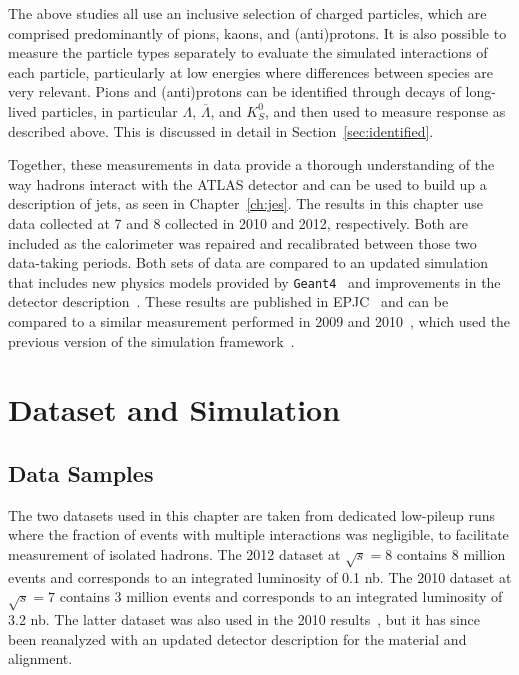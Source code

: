 The above studies all use an inclusive selection of charged particles, which are comprised predominantly of pions, kaons, and (anti)protons.
It is also possible to measure the particle types separately to evaluate the simulated interactions of each particle, particularly at low energies where differences between species are very relevant.
Pions and (anti)protons can be identified through decays of long-lived particles, in particular $\Lambda$, $\overline{\Lambda}$, and $K_{S}^{0}$, and then used to measure response as described above.
This is discussed in detail in Section~\ref{sec:identified}.

Together, these measurements in data provide a thorough understanding of the way hadrons interact with the ATLAS detector and can be used to build up a description of jets, as seen in Chapter~\ref{ch:jes}.
The results in this chapter use data collected at 7 and 8 \TeV collected in 2010 and 2012, respectively.
Both are included as the calorimeter was repaired and recalibrated between those two data-taking periods.
Both sets of data are compared to an updated simulation that includes new physics models provided by \texttt{Geant4}~\cite{GEANT4} and improvements in the detector description~\cite{PERF-2011-08,PERF-2013-05}.
These results are published in \ac{EPJC}~\cite{PERF-2015-05} and can be compared to a similar measurement performed in 2009 and 2010~\cite{PERF-2011-05}, which used the previous version of the simulation framework~\cite{SOFT-2010-01}.

\section{Dataset and Simulation}

\subsection{Data Samples}
The two datasets used in this chapter are taken from dedicated low-pileup runs where the fraction of events with multiple interactions was negligible, to facilitate measurement of isolated hadrons.
The 2012 dataset at $\sqrt{s} = 8$ \TeV contains 8 million events and corresponds to an integrated luminosity of 0.1 nb.
The 2010 dataset at $\sqrt{s} = 7$ \TeV contains 3 million events and corresponds to an integrated luminosity of 3.2 nb.
The latter dataset was also used in the 2010 results~\cite{PERF-2011-05}, but it has since been reanalyzed with an updated detector description for the material and alignment.

